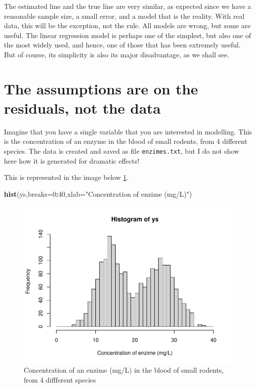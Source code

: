 \documentclass[
]{book}
\newenvironment{Shaded}{\begin{snugshade}}{\end{snugshade}}
\newcommand{\AttributeTok}[1]{\textcolor[rgb]{0.13,0.29,0.53}{#1}}
\newcommand{\DecValTok}[1]{\textcolor[rgb]{0.00,0.00,0.81}{#1}}
\newcommand{\FunctionTok}[1]{\textcolor[rgb]{0.13,0.29,0.53}{\textbf{#1}}}
\newcommand{\NormalTok}[1]{#1}
\newcommand{\SpecialCharTok}[1]{\textcolor[rgb]{0.81,0.36,0.00}{\textbf{#1}}}
\newcommand{\StringTok}[1]{\textcolor[rgb]{0.31,0.60,0.02}{#1}}
\begin{document}
The estimated line and the true line are very similar, as expected since we have a reasonable sample size, a small error, and a model that is the reality. With real data, this will be the exception, not the rule. All models are wrong, but some are useful. The linear regression model is perhaps one of the simplest, but also one of the most widely used, and hence, one of those that has been extremely useful. But of course, its simplicity is also its major disadvantage, as we shall see.

\section{The assumptions are on the residuals, not the data}\label{the-assumptions-are-on-the-residuals-not-the-data}

Imagine that you have a single variable that you are interested in modelling. This is the concentration of an enzyme in the blood of small rodents, from 4 different species. The data is created and saved as file \texttt{enzimes.txt}, but I do not show here how it is generated for dramatic effects!

This is represented in the image below \ref{fig:figrodents}.

\begin{Shaded}
\begin{Highlighting}[]
\FunctionTok{hist}\NormalTok{(ys,}\AttributeTok{breaks=}\DecValTok{0}\SpecialCharTok{:}\DecValTok{40}\NormalTok{,}\AttributeTok{xlab=}\StringTok{"Concentration of enzime (mg/L)"}\NormalTok{)}
\end{Highlighting}
\end{Shaded}

\begin{figure}

{\centering \includegraphics[width=0.8\linewidth]{ECOMODbook_files/figure-latex/figrodents-1} 

}

\caption{Concentration of an enzime (mg/L) in the blood of small rodents, from 4 diffferent species}\label{fig:figrodents}
\end{figure}
\end{document}
